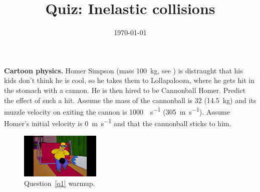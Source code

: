 \documentclass[quiz,addpoints,noanswers]{exam}
\title{Quiz: Inelastic collisions}
\date{\today}
\author{\mobeardInstructorShort}
\begin{document}
\maketitle


\begin{questions}
\question\label{q1} \textbf{Cartoon physics.} Homer Simpson (mass \SI{100}{\kilo\gram}, see ) is distraught that his kids don't think he is cool, so he takes them to Lollapalooza, where he gets hit in the stomach with a cannon. He is then hired to be Cannonball Homer. Predict the effect of such a hit. Assume the mass of the cannonball is \SI{32}{\pound} (\SI{14.5}{\kilo\gram}) and its muzzle velocity on exiting the cannon is \SI{1000}{\foot\per\second} (\SI{305}{\meter\per\second}). Assume Homer's initial velocity is \SI{0}{\meter\per\second} and that the cannonball sticks to him. 
\begin{figure}[h]
\begin{center}
\includegraphics[width=1.5in]{homer.jpg}
\end{center}
\caption{Question~\ref{q1} warmup.}
\label{fig:q1}
\end{figure}
\end{questions}
\end{document}
